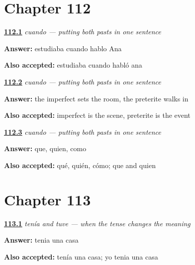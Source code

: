 \section*{Chapter 112}

\noindent\begin{minipage}[t]{\linewidth}
\raggedright
\hyperlink{review-ES-C48-cuando-say}{\textbf{112.1}} \emph{cuando — putting both pasts in one sentence}\par
\small \textbf{Answer:} estudiaba cuando hablo Ana\par
\footnotesize \textbf{Also accepted:} estudiaba cuando habló ana
\end{minipage}\par\medskip

\noindent\begin{minipage}[t]{\linewidth}
\raggedright
\hyperlink{review-ES-C48-cuando-which}{\textbf{112.2}} \emph{cuando — putting both pasts in one sentence}\par
\small \textbf{Answer:} the imperfect sets the room, the preterite walks in\par
\footnotesize \textbf{Also accepted:} imperfect is the scene, preterite is the event
\end{minipage}\par\medskip

\noindent\begin{minipage}[t]{\linewidth}
\raggedright
\hyperlink{review-ES-C48-cuando-family}{\textbf{112.3}} \emph{cuando — putting both pasts in one sentence}\par
\small \textbf{Answer:} que, quien, como\par
\footnotesize \textbf{Also accepted:} qué, quién, cómo; que and quien
\end{minipage}\par\medskip

\section*{Chapter 113}

\noindent\begin{minipage}[t]{\linewidth}
\raggedright
\hyperlink{review-ES-C48-tenia-tuve-had}{\textbf{113.1}} \emph{tenía and tuve — when the tense changes the meaning}\par
\small \textbf{Answer:} tenia una casa\par
\footnotesize \textbf{Also accepted:} tenía una casa; yo tenia una casa
\end{minipage}\par\medskip

